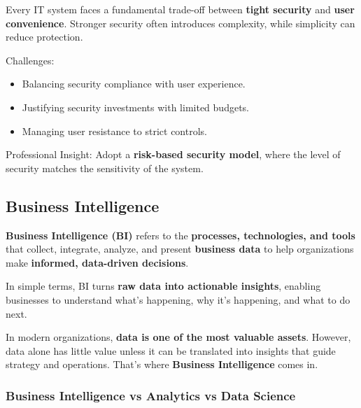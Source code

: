 \indent

Every IT system faces a fundamental trade-off between \textbf{tight security} and \textbf{user convenience}. Stronger security often introduces complexity, while simplicity can reduce protection.

Challenges:

\begin{itemize}
    \item Balancing security compliance with user experience.
    \item Justifying security investments with limited budgets.
    \item Managing user resistance to strict controls.
\end{itemize}

Professional Insight: Adopt a \textbf{risk-based security model}, where the level of security matches the sensitivity of the system.

\subsection{Business Intelligence}

\textbf{Business Intelligence (BI)} refers to the \textbf{processes, technologies, and tools} that collect, integrate, analyze, and present \textbf{business data} to help organizations make \textbf{informed, data-driven decisions}.

In simple terms, BI turns \textbf{raw data into actionable insights}, enabling businesses to understand what’s happening, why it’s happening, and what to do next.

In modern organizations, \textbf{data is one of the most valuable assets}. However, data alone has little value unless it can be translated into insights that guide strategy and operations. That’s where \textbf{Business Intelligence} comes in.

\subsubsection{Business Intelligence vs Analytics vs Data Science}

\indent

